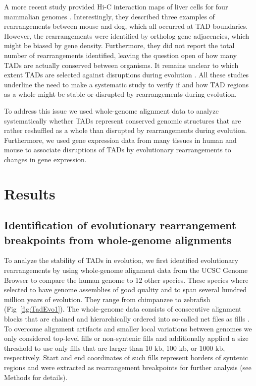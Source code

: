 \documentclass[a4paper,twoside=true,openright,parskip=full,chapterprefix=true,11pt,headings=normal,bibliography=totoc,listof=totoc,titlepage=on,captions=tableabove,draft=false]{scrreprt}
\theoremstyle{definition}
\theoremstyle{definition}
\theoremstyle{definition}
\theoremstyle{remark}
\begin{document}
A more recent study provided Hi-C interaction maps of liver cells for
four mammalian genomes \citep{VietriRudan2015}. Interestingly, they
described three examples of rearrangements between mouse and dog, which
all occurred at TAD boundaries. However, the rearrangements were
identified by ortholog gene adjacencies, which might be biased by gene
density. Furthermore, they did not report the total number of
rearrangements identified, leaving the question open of how many TADs
are actually conserved between organisms. It remains unclear to which
extent TADs are selected against disruptions during evolution
\citep{Nora2013}. All these studies underline the need to make a
systematic study to verify if and how TAD regions as a whole might be
stable or disrupted by rearrangements during evolution.

To address this issue we used whole-genome alignment data to analyze
systematically whether TADs represent conserved genomic structures that
are rather reshuffled as a whole than disrupted by rearrangements during
evolution. Furthermore, we used gene expression data from many tissues
in human and mouse to associate disruptions of TADs by evolutionary
rearrangements to changes in gene expression.

\hypertarget{results-1}{%
\section{Results}\label{results-1}}

\hypertarget{identification-of-evolutionary-rearrangement-breakpoints-from-whole-genome-alignments}{%
\subsection{Identification of evolutionary rearrangement breakpoints
from whole-genome
alignments}\label{identification-of-evolutionary-rearrangement-breakpoints-from-whole-genome-alignments}}

To analyze the stability of TADs in evolution, we first identified
evolutionary rearrangements by using whole-genome alignment data from
the UCSC Genome Browser \citep{Kent2003, Kent2002} to compare the human
genome to 12 other species. These species where selected to have genome
assemblies of good quality and to span several hundred million years of
evolution. They range from chimpanzee to zebrafish
(Fig~\ref{fig:TadEvo1}). The whole-genome data consists of consecutive
alignment blocks that are chained and hierarchically ordered into
so-called net files as fills \citep{Kent2003}. To overcome alignment
artifacts and smaller local variations between genomes we only
considered top-level fills or non-syntenic fills and additionally
applied a size threshold to use only fills that are larger than 10 kb,
100 kb, or 1000 kb, respectively. Start and end coordinates of such
fills represent borders of syntenic regions and were extracted as
rearrangement breakpoints for further analysis (see Methods for
details).
\end{document}
